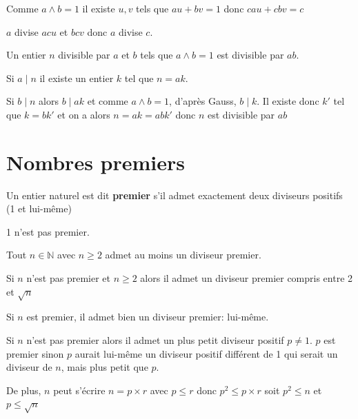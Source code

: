 \documentclass[french]{book}
\begin{document}
\begin{demo}

Comme $a \wedge b=1$ il existe $u,v$ tels que $au+bv=1$ donc $cau+cbv=c$

$a$ divise $acu$ et $bcv$ donc $a$ divise $c$.

\end{demo}

\begin{thm}

Un entier $n$ divisible par $a$ et $b$ tels que $a\wedge b=1$ est divisible par $ab$.
\end{thm}

\begin{demo}

Si $a\mid n$ il existe un entier $k$ tel que $n=ak$.

Si $b\mid n$ alors $b\mid ak$ et comme $a\wedge b=1$, d'après Gauss, $b\mid k$. Il existe donc $k'$ tel que $k=bk'$ et on a alors $n=ak=abk'$ donc $n$ est divisible par $ab$

\end{demo}


\section{Nombres premiers}


\begin{defn}

Un entier naturel est dit \textbf{premier} s'il admet exactement deux diviseurs positifs (1 et lui-même)

\end{defn}

\begin{rem}
1 n'est pas premier.
\end{rem}

\begin{thm}

 Tout $n\in \mathbb{N}$ avec $n\geq 2$ admet au moins un diviseur premier.

 Si $n$ n'est pas premier et $n\geq 2$ alors il admet un diviseur premier compris entre 2 et $\sqrt{n}$
 \end{thm}


\begin{demo}

Si $n$ est premier, il admet bien un diviseur premier: lui-même.

Si $n$ n'est pas premier alors il admet un plus petit diviseur positif $p\neq 1$.
$p$ est premier sinon $p$ aurait lui-même un diviseur positif différent de 1 qui serait un diviseur de $n$, mais plus petit que $p$.

De plus, $n$ peut s'écrire $n=p \times r$ avec $p\leq r$ donc $p^{2}\leq p \times r$ soit $p^{2} \leq n$ et $p\leq\sqrt{n}$

\end{demo}
\end{document}
